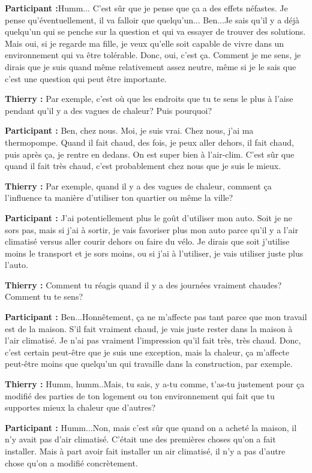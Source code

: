 \textbf{Participant :}Humm... C'est sûr que je pense que ça a des effets néfastes. Je pense qu'éventuellement, il va falloir que quelqu'un... Ben...Je sais qu'il y a déjà quelqu'un qui se penche sur la question et qui va essayer de trouver des solutions. Mais oui, si je regarde ma fille, je veux qu'elle soit capable de vivre dans un environnement qui va être tolérable. Donc, oui, c'est ça. Comment je me sens, je dirais que je suis quand même relativement assez neutre, même si je le sais que c'est une question qui peut être importante.

\textbf{Thierry :} Par exemple, c'est où que les endroits que tu te sens le plus à l'aise pendant qu'il y a des vagues de chaleur? Puis pourquoi?

\textbf{Participant :} Ben, chez nous. Moi, je suis vrai. Chez nous, j'ai ma thermopompe. Quand il fait chaud, des fois, je peux aller dehors, il fait chaud, puis après ça, je rentre en dedans. On est super bien à l'air-clim. C'est sûr que quand il fait très chaud, c'est probablement chez nous que je suis le mieux.

\textbf{Thierry :} Par exemple, quand il y a des vagues de chaleur, comment ça l'influence ta manière d'utiliser ton quartier ou même la ville?

\textbf{Participant :} J'ai potentiellement plus le goût d'utiliser mon auto. Soit je ne sors pas, mais si j'ai à sortir, je vais favoriser plus mon auto parce qu'il y a l'air climatisé versus aller courir dehors ou faire du vélo. Je dirais que soit j'utilise moins le transport et je sors moins, ou si j'ai à l'utiliser, je vais utiliser juste plus l'auto.

\textbf{Thierry :} Comment tu réagis quand il y a des journées vraiment chaudes? Comment tu te sens?

\textbf{Participant :} Ben...Honnêtement, ça ne m'affecte pas tant parce que mon travail est de la maison. S'il fait vraiment chaud, je vais juste rester dans la maison à l'air climatisé. Je n'ai pas vraiment l'impression qu'il fait très, très chaud. Donc, c'est certain peut-être que je suis une exception, mais la chaleur, ça m'affecte peut-être moins que quelqu'un qui travaille dans la construction, par exemple.

\textbf{Thierry :} Humm, humm..Mais, tu sais, y a-tu comme, t'as-tu justement pour ça modifié des parties de ton logement ou ton environnement qui fait que tu supportes mieux la chaleur que d'autres?

\textbf{Participant :} Humm...Non, mais c'est sûr que quand on a acheté la maison, il n'y avait pas d'air climatisé. C'était une des premières choses qu'on a fait installer. Mais à part avoir fait installer un air climatisé, il n'y a pas d'autre chose qu'on a modifié concrètement.

